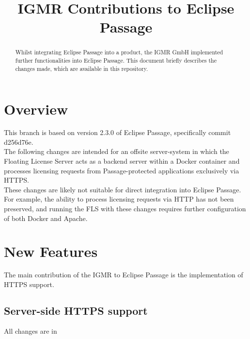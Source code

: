 \documentclass[]{article}
\title{IGMR Contributions to Eclipse Passage}
\author{}
\begin{document}
\maketitle

\begin{abstract}
Whilst integrating Eclipse Passage into a product, the IGMR GmbH implemented further functionalities into Eclipse Passage. This document briefly describes the changes made, which are available in this repository.

\end{abstract}

\pagebreak

\tableofcontents

\pagebreak

\section{Overview}

This branch is based on version 2.3.0 of Eclipse Passage, specifically commit d256d76e. \\

The following changes are intended for an offsite server-system in which the Floating License Server acts as a backend server within a Docker container and processes licensing requests from Passage-protected applications exclusively via HTTPS. \\

These changes are likely not suitable for direct integration into Eclipse Passage. For example, the ability to process licensing requests via HTTP has not been preserved, and running the FLS with these changes requires further configuration of both Docker and Apache. 

\pagebreak

\section{New Features}

The main contribution of the IGMR to Eclipse Passage is the implementation of HTTPS support.

\subsection{Server-side HTTPS  support}
All changes are in \\  \\
\end{document}
